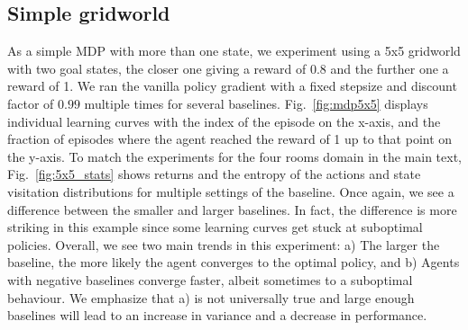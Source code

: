 \subsection{Simple gridworld}
\label{app:simple_mdp}
As a simple MDP with more than one state, we experiment using a 5x5 gridworld with two goal states, the closer one giving a reward of 0.8 and the further one a reward of 1. We ran the vanilla  policy gradient with a fixed stepsize and discount factor of $0.99$ multiple times for several baselines. 
Fig.~\ref{fig:mdp5x5} displays individual learning curves with the index of the episode on the x-axis, and the fraction of episodes where the agent reached the reward of 1 up to that point on the  y-axis.
To match the experiments for the four rooms domain in the main text, Fig.~\ref{fig:5x5_stats} shows returns and the entropy of the actions and state visitation distributions for multiple settings of the baseline. 
Once again, we see a difference between the smaller and larger baselines. In fact, the difference is more striking in this example since some learning curves get stuck at suboptimal policies. Overall, we see two main trends in this experiment: a) The larger the baseline, the more likely the agent converges to the optimal policy, and b) Agents with negative baselines converge faster, albeit sometimes to a suboptimal behaviour.  We emphasize that a) is not universally true and large enough baselines will lead to an increase in variance and a decrease in performance.


